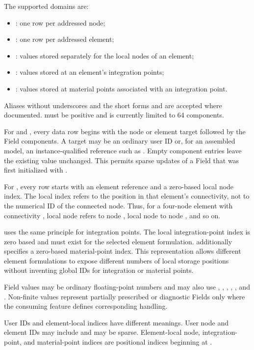 The supported domains are:
\begin{itemize}
  \item {}: one row per addressed node;
  \item {}: one row per addressed element;
  \item {}: values stored separately for the local nodes of an element;
  \item {}: values stored at an element's integration points;
  \item {}: values stored at material points associated with an integration point.
\end{itemize}
Aliases without underscores and the short forms  and  are accepted where documented.  must be positive and is currently limited to 64 components.

For  and , every data row begins with the node or element target followed by the Field components. A target may be an ordinary user ID or, for an assembled model, an instance-qualified reference such as . Empty component entries leave the existing value unchanged. This permits sparse updates of a Field that was first initialized with .

For , every row starts with an element reference and a zero-based local node index. The local index refers to the position in that element's connectivity, not to the numerical ID of the connected node. Thus, for a four-node element with connectivity , local node  refers to node , local node  to node , and so on.

 uses the same principle for integration points. The local integration-point index is zero based and must exist for the selected element formulation.  additionally specifies a zero-based material-point index. This representation allows different element formulations to expose different numbers of local storage positions without inventing global IDs for integration or material points.

Field values may be ordinary floating-point numbers and may also use , , , , , and . Non-finite values represent partially prescribed or diagnostic Fields only where the consuming feature defines corresponding handling.

User IDs and element-local indices have different meanings. User node and element IDs may include  and may be sparse. Element-local node, integration-point, and material-point indices are positional indices beginning at .

